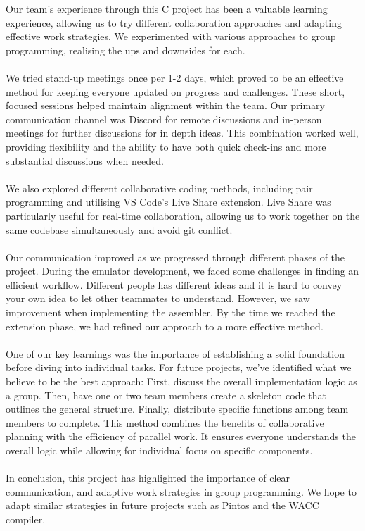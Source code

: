 \documentclass[10pt]{article}
\begin{document}
Our team's experience through this C project has been a valuable learning experience, allowing us to try different collaboration approaches and adapting effective work strategies. We experimented with various approaches to group programming, realising the ups and downsides for each.\\
\\
We tried stand-up meetings once per 1-2 days, which proved to be an effective method for keeping everyone updated on progress and challenges. These short, focused sessions helped maintain alignment within the team. Our primary communication channel was Discord for remote discussions and in-person meetings for further discussions for in depth ideas. This combination worked well, providing flexibility and the ability to have both quick check-ins and more substantial discussions when needed.\\
\\
We also explored different collaborative coding methods, including pair programming and utilising VS Code's Live Share extension. Live Share was particularly useful for real-time collaboration, allowing us to work together on the same codebase simultaneously and avoid git conflict.\\
\\
Our communication improved as we progressed through different phases of the project. During the emulator development, we faced some challenges in finding an efficient workflow. Different people has different ideas and it is hard to convey your own idea to let other teammates to understand. However, we saw improvement when implementing the assembler. By the time we reached the extension phase, we had refined our approach to a more effective method. \\
\\
One of our key learnings was the importance of establishing a solid foundation before diving into individual tasks. For future projects, we've identified what we believe to be the best approach: First, discuss the overall implementation logic as a group. Then, have one or two team members create a skeleton code that outlines the general structure. Finally, distribute specific functions among team members to complete. This method combines the benefits of collaborative planning with the efficiency of parallel work. It ensures everyone understands the overall logic while allowing for individual focus on specific components. \\
\\
In conclusion, this project has highlighted the importance of clear communication, and adaptive work strategies in group programming. We hope to adapt similar strategies in future projects such as Pintos and the WACC compiler. 
\end{document}
